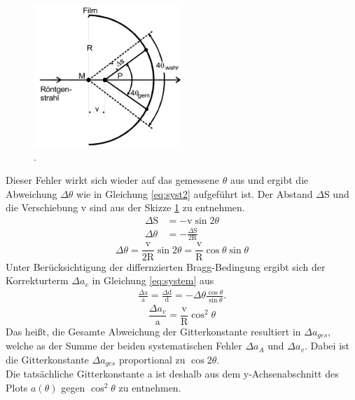 \begin{figure}
\centering
	\includegraphics[width = 0.5\textwidth]{Abbildungen/Syst2.png}
	\caption{\cite{Anleitung}.}
	\label{fig:sys2}
\end{figure}
Dieser Fehler wirkt sich wieder auf das gemessene $\theta$ aus und ergibt die Abweichung $\Delta \theta$ wie in Gleichung \ref{eq:syst2} aufgeführt ist.
Der Abstand $\Delta$S und die Verschiebung v sind aus der Skizze \ref{fig:sys2} zu entnehmen.
\begin{align*}
\Delta \text{S} &  = -\text{v} \sin{2 \theta} \\
\Delta \theta & = -\frac{\Delta \text{S}}{2\text{R}}
\end{align*}
\begin{equation}
\Delta \theta = \frac{\text{v}}{2\text{R}}\sin{2\theta} = \frac{\text{v}}{\text{R}}\cos{\theta}\sin{\theta}
\label{eq:syst2}
\end{equation}
Unter Berücksichtigung der differnzierten Bragg-Bedingung ergibt sich der Korrekturterm $\Delta a_v$ in Gleichung \ref{eq:system} aus
\begin{align*}
\frac{\Delta \text{a}}{\text{a}} = \frac{\Delta \text{d}}{\text{d}} = -\Delta \theta \frac{\cos{\theta}}{\sin{\theta}}.
\end{align*}
\begin{equation}
\frac{\Delta a_v}{\text{a}} = \frac{\text{v}}{\text{R}}\cos^2{\theta}
\label{eq:system}
\end{equation}
Das heißt, die Gesamte Abweichung der Gitterkonstante resultiert in $\Delta a_{ges}$, welche as der Summe der beiden systematischen Fehler $\Delta a_A$ und $\Delta a_v$. 
Dabei ist die Gitterkonstante $\Delta a_{ges}$ proportional zu $\cos2{\theta}$.\\
Die tatsächliche Gitterkonstante a ist deshalb aus dem y-Achsenabschnitt des Plots $a(\theta)$ gegen $\cos^2{\theta}$ zu entnehmen.

